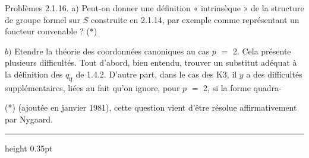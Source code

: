 \documentclass[9pt]{article}
\newcommand{\CanonText}[1]{\par{\fontsize{8.0}{9.35}\selectfont\RaggedRight #1\par}\vspace{2.2pt}}
\begin{document}
\begin{minipage}[t][\dimexpr\textheight-5pt\relax][t]{\textwidth}
\CanonText{Problèmes 2.1.16. a) Peut-on donner une définition « intrinsèque » de la structure de groupe formel sur \(S\) construite en 2.1.14, par exemple comme représentant un foncteur convenable ? (*)}
\CanonText{\(b)\) Etendre la théorie des coordonnées canoniques au cas \(p\) \(=\) 2. Cela présente plusieurs difficultés. Tout d'abord, bien entendu, trouver un substitut adéquat à la définition des \(q_{\mathrm{ij}}\) de 1.4.2. D'autre part, dans le cas des K3, il \(y\) a des difficultés supplémentaires, liées au fait qu'on ignore, pour \(p\) \(=\) 2, si la forme quadra-}
\CanonText{(*) (ajoutée en janvier 1981), cette question vient d'être résolue affirmativement par Nygaard.}
\vfill
{\color{Accent}\hrule height 0.35pt}\vspace{3pt}
\end{minipage}
\newpage
\end{document}
